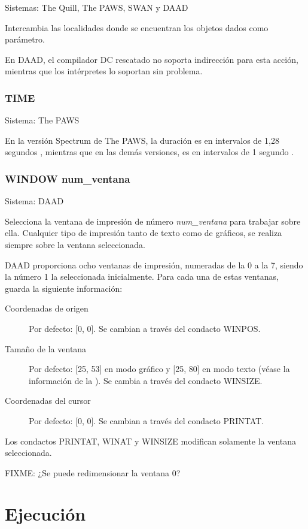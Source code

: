 \documentclass[11pt, a5paper]{article}
\newcommand{\quill}{\textsf{The Quill}\xspace}
\newcommand{\paw}{\textsf{The PAWS}\xspace}
\newcommand{\swan}{\textsf{SWAN}\xspace}
\newcommand{\daad}{\textsf{DAAD}\xspace}
\newcommand{\sistema}[1]{\noindent Sistema: #1 \nopagebreak}
\newcommand{\sistemas}[1]{\noindent Sistemas: #1 \nopagebreak}
\begin{document}
\sistemas{\quill, \paw, \swan y \daad}

Intercambia las localidades donde se encuentran los objetos dados como parámetro.

En \daad, el compilador DC rescatado no soporta indirección para esta acción, mientras que los intérpretes lo soportan sin problema.

\subsubsection{TIME}

\sistema{\paw}

En la versión Spectrum de \paw, la duración es en intervalos de 1,28 segundos \cite{PawsZX}, mientras que en las demás versiones, es en intervalos de 1 segundo \cite{PawsPC}.

\subsubsection{WINDOW num\_ventana}

\sistema{\daad}

Selecciona la ventana de impresión de número \emph{num\_ventana} para trabajar sobre ella. Cualquier tipo de impresión tanto de texto como de gráficos, se realiza siempre sobre la ventana seleccionada.

\daad proporciona ocho ventanas de impresión, numeradas de la 0 a la 7, siendo la número 1 la seleccionada inicialmente. Para cada una de estas ventanas, guarda la siguiente información:

\begin{description}
  \item[Coordenadas de origen] Por defecto: [0, 0]. Se cambian a través del condacto WINPOS.

  \item[Tamaño de la ventana] Por defecto: [25, 53] en modo gráfico y [25, 80] en modo texto (véase la información de la \textbf{}). Se cambia a través del condacto WINSIZE.

  \item[Coordenadas del cursor] Por defecto: [0, 0]. Se cambian a través del condacto PRINTAT.
\end{description}

Los condactos PRINTAT, WINAT y WINSIZE modifican solamente la ventana seleccionada.

FIXME: ¿Se puede redimensionar la ventana 0?


\section{Ejecución}
\end{document}
